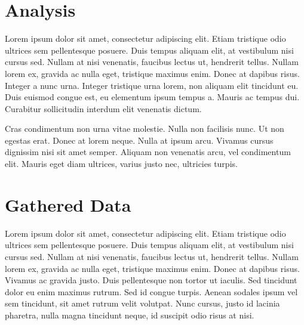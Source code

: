 \documentclass[11pt, a4paper]{resources/JTH}
\begin{document}
\section{Analysis}
\label{chap:Analysis}

    Lorem ipsum dolor sit amet, consectetur adipiscing elit. Etiam tristique odio ultrices sem pellentesque posuere. Duis tempus aliquam elit, at vestibulum nisi cursus sed. Nullam at nisi venenatis, faucibus lectus ut, hendrerit tellus. Nullam lorem ex, gravida ac nulla eget, tristique maximus enim. Donec at dapibus risus. Integer a nunc urna. Integer tristique urna lorem, non aliquam elit tincidunt eu. Duis euismod congue est, eu elementum ipsum tempus a. Mauris ac tempus dui. Curabitur sollicitudin interdum elit venenatis dictum.
    
    Cras condimentum non urna vitae molestie. Nulla non facilisis nunc. Ut non egestas erat. Donec at lorem neque. Nulla at ipsum arcu. Vivamus cursus dignissim nisi sit amet semper. Aliquam non venenatis arcu, vel condimentum elit. Mauris eget diam ultrices, varius justo nec, ultricies turpis.

\newpage



\newpage
\appendix

\section{Gathered Data}

    Lorem ipsum dolor sit amet, consectetur adipiscing elit. Etiam tristique odio ultrices sem pellentesque posuere. Duis tempus aliquam elit, at vestibulum nisi cursus sed. Nullam at nisi venenatis, faucibus lectus ut, hendrerit tellus. Nullam lorem ex, gravida ac nulla eget, tristique maximus enim. Donec at dapibus risus. Vivamus ac gravida justo. Duis pellentesque non tortor ut iaculis. Sed tincidunt dolor eu enim maximus rutrum. Sed id congue turpis. Aenean sodales ipsum vel sem tincidunt, sit amet rutrum velit volutpat. Nunc cursus, justo id lacinia pharetra, nulla magna tincidunt neque, id suscipit odio risus at nisi.
\end{document}
